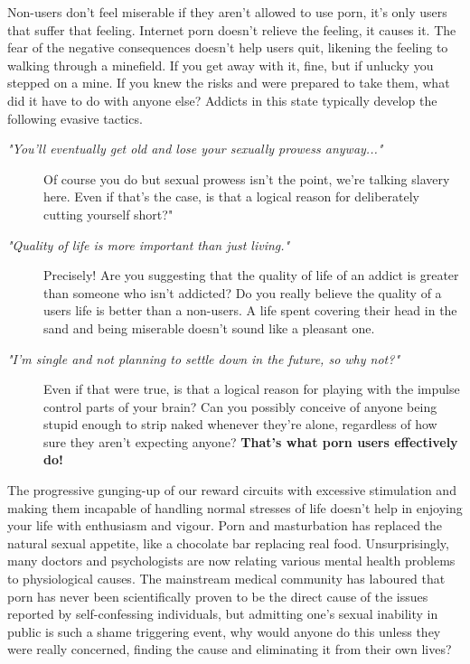 \documentclass[easypeasy.tex]{subfiles}
\begin{document}
Non-users don't feel miserable if they aren't allowed to use porn, it's only users that suffer that feeling. Internet porn doesn't relieve the feeling, it causes it. The fear of the negative consequences doesn't help users quit, likening the feeling to walking through a minefield. If you get away with it, fine, but if unlucky you stepped on a mine. If you knew the risks and were prepared to take them, what did it have to do with anyone else? Addicts in this state typically develop the following evasive tactics.
\begin{description}
  \item [\textit{"You'll eventually get old and lose your sexually prowess anyway..."}] Of course you do but sexual prowess isn't the point, we're talking slavery here. Even if that's the case, is that a logical reason for deliberately cutting yourself short?"

  \item  [ \textit{"Quality of life is more important than just living."}] Precisely! Are you suggesting that the quality of life of an addict is greater than someone who isn't addicted? Do you really believe the quality of a users life is better than a non-users. A life spent covering their head in the sand and being miserable doesn't sound like a pleasant one.

  \item [\textit{"I'm single and not planning to settle down in the future, so why not?"}] Even if that were true, is that a logical reason for playing with the impulse control parts of your brain? Can you possibly conceive of anyone being stupid enough to strip naked whenever they're alone, regardless of how sure they aren't expecting anyone? \textbf{That's what porn users effectively do!}
\end{description}

The progressive gunging-up of our reward circuits with excessive stimulation and making them incapable of handling normal stresses of life doesn't help in enjoying your life with enthusiasm and vigour. Porn and masturbation has replaced the natural sexual appetite, like a chocolate bar replacing real food. Unsurprisingly, many doctors and psychologists are now relating various mental health problems to physiological causes. The mainstream medical community has laboured that porn has never been scientifically proven to be the direct cause of the issues reported by self-confessing individuals, but admitting one's sexual inability in public is such a shame triggering event, why would anyone do this unless they were really concerned, finding the cause and eliminating it from their own lives?
\end{document}

